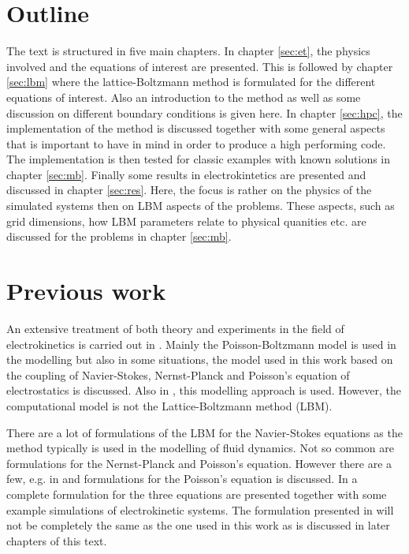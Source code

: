 \section{Outline}
The text is structured in five main chapters. In chapter \ref{sec:et},
the physics involved and the equations of interest are presented. This
is followed by chapter \ref{sec:lbm} where the lattice-Boltzmann
method is formulated for the different equations of interest. Also an
introduction to the method as well as some discussion on different
boundary conditions is given here. In chapter \ref{sec:hpc}, the
implementation of the method is discussed together with some general
aspects that is important to have in mind in order to produce a high
performing code. The implementation is then tested for classic
examples with known solutions in chapter \ref{sec:mb}. Finally some
results in electrokintetics are presented and discussed in chapter
\ref{sec:res}. Here, the focus is rather on the physics of the
simulated systems then on LBM aspects of the problems. These aspects,
such as grid dimensions, how LBM parameters relate to physical
quanities etc. are discussed for the problems in chapter \ref{sec:mb}.

\section{Previous work}
An extensive treatment of both theory and experiments in the field of
electrokinetics is carried out in \cite{dongquing-ren-book}. Mainly
the Poisson-Boltzmann model is used in the modelling but also in some
situations, the model used in this work based on the coupling of
Navier-Stokes, Nernst-Planck and Poisson's equation of electrostatics
is discussed. Also in \cite{ren-elvis-paper}, this modelling approach
is used. However, the computational model is not the Lattice-Boltzmann
method (LBM). 

There are a lot of formulations of the LBM for the Navier-Stokes
equations as the method typically is used in the modelling of fluid
dynamics. Not so common are formulations for the Nernst-Planck and
Poisson's equation. However there are a few, e.g. in \cite{wang-poi}
and \cite{chai_poi} formulations for the Poisson's equation is
discussed. In \cite{lbm-wang} a complete formulation for the three
equations are presented together with some example simulations of
electrokinetic systems. The formulation presented in \cite{lbm-wang}
will not be completely the same as the one used in this work as is
discussed in later chapters of this text. 
